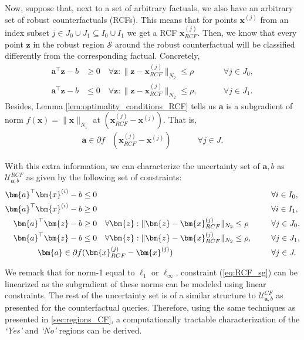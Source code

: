 \documentclass{article}
\begin{document}
Now, suppose that, next to a set of arbitrary factuals, we also have an arbitrary set of robust counterfactuals (RCFs). This means that for points $\bm{x}^{(j)}$ from an index subset $j\in J_{0}\cup J_1\subseteq I_{0}\cup I_1$ we get a RCF $\bm{x}_{RCF}^{(j)}$.   Then, we know that every point $\bm{z}$ in the robust region $\mathcal S$ around the robust counterfactual will be classified differently from the corresponding factual. Concretely,
\begin{align}
  \bm{a}^{\top}\bm{z} -b&\geq 0  \quad\forall \bm{z} : \| \bm{z} - \bm{x}_{RCF}^{(j)}\|_{N_2} \leq \rho&&\quad\forall j \in J_{0},\label{eq:RCF_J0}\\
   \bm{a}^{\top}\bm{z} -b&\leq 0  \quad\forall \bm{z} : \| \bm{z} - \bm{x}_{RCF}^{(j)}\|_{N_2} \leq \rho,\;\;&&\quad\forall j \in J_1.\label{eq:RCF_J1}
\end{align} 
Besides, Lemma \ref{lem:optimality_conditions_RCF} tells us $\bm{a}$ is a subgradient of norm $f(\bm{x}) = \|\bm{x}\|_{N_1}$ at $(\bm{x}_{RCF}^{(j)} - \bm{x}^{(j)})$. That is,
\begin{align}
    \bm{a}\in\partial f&(\bm{x}_{RCF}^{(j)} - \bm{x}^{(j)})\;\;&&\quad\forall j \in J.\label{eq:RCF_sg}
\end{align}

With this extra information, we can characterize the uncertainty set of $\bm{a},b$  as $\mathcal{U}_{\bm{a},b}^{RCF}$ as given by the following set of constraints:
\begin{align*}
  \bm{a}^{\top}\bm{x}^{(i)} -b&\leq 0  &&\quad \forall i \in I_{0}, \notag\\
  \bm{a}^{\top}\bm{x}^{(i)} -b&\geq 0  &&\quad \forall i \in I_1, \notag \\ 
  \bm{a}^{\top}\bm{z} -b&\geq 0  \quad\forall \bm{z} : \| \bm{z} - \bm{x}_{RCF}^{(j)}\|_{N_2} \leq \rho&&\quad\forall j \in J_{0},\\
   \bm{a}^{\top}\bm{z} -b&\leq 0  \quad\forall \bm{z} : \| \bm{z} - \bm{x}_{RCF}^{(j)}\|_{N_2} \leq \rho,\;\;&&\quad\forall j \in J_1,\\
   \bm{a}\in\partial f&(\bm{x}_{RCF}^{(j)} - \bm{x}^{(j)}) \;\;&&\quad\forall j \in J.
\end{align*} 

We remark that for norm-1 equal to $\ell_1$ or $\ell_{\infty}$, constraint (\ref{eq:RCF_sg}) can be linearized as the subgradient of these norms can be modeled using linear constraints. The rest of the uncertainty set is of a similar structure to $\mathcal{U}_{\bm{a},b}^{CF}$ as presented for the counterfactual queries. Therefore, using the same techniques as presented in \cref{sec:regions_CF}, a computationally tractable characterization of the \textit{`Yes'} and \textit{`No'} regions can be derived.
\end{document}
